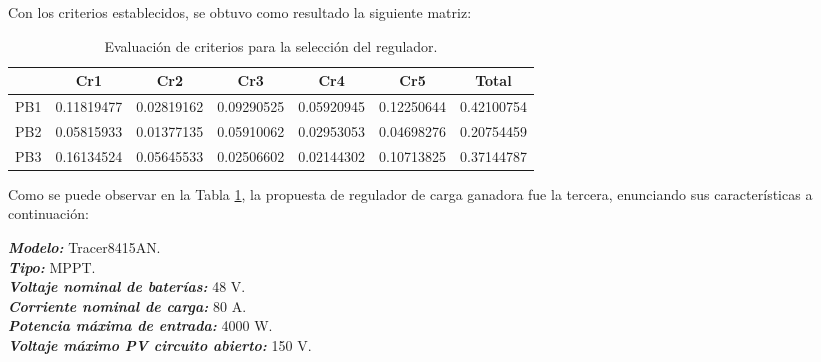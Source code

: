 Con los criterios establecidos, se obtuvo como resultado la siguiente matriz:
\begin{table}[H]
	\centering
	\caption{Evaluación de criterios para la selección del regulador.}
	\begin{tabular}{|c|c|c|c|c|c|c|}
		\hline   
		\multicolumn{1}{|r|}{} & \cellcolor[rgb]{ .612,  .761,  .898}Cr1 & \cellcolor[rgb]{ .612,  .761,  .898}Cr2 & \cellcolor[rgb]{ .612,  .761,  .898}Cr3 & \cellcolor[rgb]{ .612,  .761,  .898}Cr4 & \cellcolor[rgb]{ .612,  .761,  .898}Cr5 & \cellcolor[rgb]{ .612,  .761,  .898}Total \\
		\hline
		\rowcolor[rgb]{ .659,  .816,  .553} PB1   & \cellcolor[rgb]{ 1,  .753,  0}0.11819477 & \cellcolor[rgb]{ 1,  .753,  0}0.02819162 & \cellcolor[rgb]{ 1,  .753,  0}0.09290525 & \cellcolor[rgb]{ 1,  .753,  0}0.05920945 & \cellcolor[rgb]{ 1,  .753,  0}0.12250644 & \cellcolor[rgb]{ 1,  .753,  0}0.42100754 \\
		\hline
		\rowcolor[rgb]{ .659,  .816,  .553} PB2   & \cellcolor[rgb]{ 1,  1,  1}0.05815933 & \cellcolor[rgb]{ 1,  1,  1}0.01377135 & \cellcolor[rgb]{ 1,  1,  1}0.05910062 & \cellcolor[rgb]{ 1,  1,  1}0.02953053 & \cellcolor[rgb]{ 1,  1,  1}0.04698276 & \cellcolor[rgb]{ 1,  1,  1}0.20754459 \\
		\hline
		\rowcolor[rgb]{ .659,  .816,  .553} PB3   & \cellcolor[rgb]{ 1,  1,  1}0.16134524 & \cellcolor[rgb]{ 1,  1,  1}0.05645533 & \cellcolor[rgb]{ 1,  1,  1}0.02506602 & \cellcolor[rgb]{ 1,  1,  1}0.02144302 & \cellcolor[rgb]{ 1,  1,  1}0.10713825 & \cellcolor[rgb]{ 1,  1,  1}0.37144787 \\
		\hline
	\end{tabular}%
	\label{tab:addlabel2}%
\end{table}%

Como se puede observar en la Tabla \ref{tab:addlabel2}, la propuesta de regulador de carga ganadora fue la tercera, enunciando sus características a continuación:

\hspace*{1em}\textbf{\textit{Modelo: }}Tracer8415AN.\\
\hspace*{2.5em}\textbf{\textit{Tipo: }}MPPT.\\
\hspace*{2.5em}\textbf{\textit{Voltaje nominal de baterías:}} 48 V.\\
\hspace*{2.5em}\textbf{\textit{Corriente nominal de carga:}} 80 A.\\
\hspace*{2.5em}\textbf{\textit{Potencia máxima de entrada: }}4000 W.\\
\hspace*{2.5em}\textbf{\textit{Voltaje máximo PV circuito abierto:}} 150 V.\\

